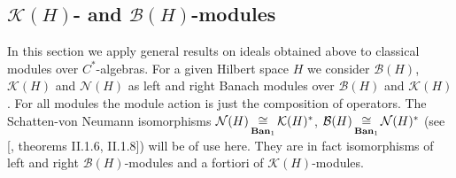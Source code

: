 
\subsection{\texorpdfstring{$\mathcal{K}(H)$}{K(H)}- and \texorpdfstring{$\mathcal{B}(H)$}{B(H)}-modules}
\label{SubSectionKHAndBHModules}

In this section we apply general results on ideals obtained above to classical modules over $C^*$-algebras.  For a given Hilbert space $H$ we consider $\mathcal{B}(H)$, $\mathcal{K}(H)$ and $\mathcal{N}(H)$ as left and right Banach modules over $\mathcal{B}(H)$ and $\mathcal{K}(H)$. For all modules the module action is just the composition of operators. The Schatten-von Neumann isomorphisms $\mathcal{N}(H)\mathop{\mathbin{\cong}}\limits_{\mathbf{Ban}_1}\mathcal{K}(H)^*$, $\mathcal{B}(H)\mathop{\mathbin{\cong}}\limits_{\mathbf{Ban}_1}\mathcal{N}(H)^*$ (see [\cite{TakThOpAlgVol1}, theorems II.1.6, II.1.8]) will be of use here. They are in fact isomorphisms of left and right $\mathcal{B}(H)$-modules and a fortiori of $\mathcal{K}(H)$-modules.

